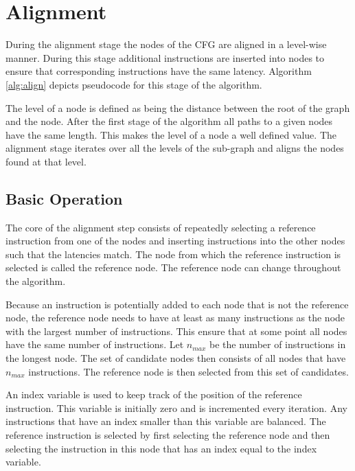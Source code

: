 \begin{figure}
 \centering

 \label{fig:problemStructures}
\end{figure}

\section{Alignment} \label{seq:alignment}

During the alignment stage the nodes of the CFG are aligned in a level-wise manner. During this stage additional instructions are inserted into nodes to ensure that corresponding instructions have the same latency.
Algorithm \ref{alg:align} depicts pseudocode for this stage of the algorithm. 

The level of a node is defined as being the distance between the root of the graph and the node. After the first stage of the algorithm all paths to a given nodes have the same length. This makes the level of a node a well 
defined value. The alignment stage iterates over all the levels of the sub-graph and aligns the nodes found at that level. 

\subsection{Basic Operation}
The core of the alignment step consists of repeatedly selecting a reference instruction from one of the nodes and inserting instructions into the other nodes such that the latencies match. The node from which the 
reference instruction is selected is called the reference node. The reference node can change throughout the algorithm. 

Because an instruction is potentially added to each node that is not the reference node, the reference node needs to have at least as many instructions as the node with the largest number of instructions. This ensure that at some point all nodes have the same number of instructions. Let $n_{max}$ be the number of instructions in the longest node. The set of candidate nodes then consists of all nodes that have $n_{max}$ instructions. The reference 
node is then selected from this set of candidates. 

An index variable is used to keep track of the position of the reference instruction. This variable is initially zero and is incremented every iteration. Any instructions that have an index smaller than this variable 
are balanced. The reference instruction is selected by first selecting the reference node and then selecting the instruction in this node that has an index equal to the index variable. 

